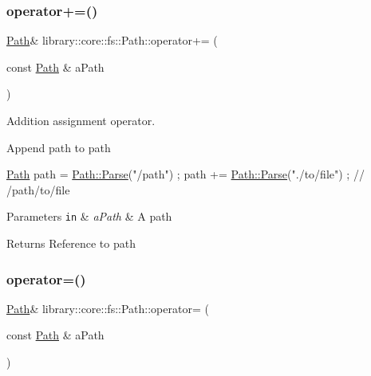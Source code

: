 \subsubsection{\texorpdfstring{operator+=()}{operator+=()}}
{\footnotesize\ttfamily \hyperlink{classlibrary_1_1core_1_1fs_1_1_path}{Path}\& library\+::core\+::fs\+::\+Path\+::operator+= (\begin{DoxyParamCaption}\item[{const \hyperlink{classlibrary_1_1core_1_1fs_1_1_path}{Path} \&}]{a\+Path }\end{DoxyParamCaption})}



Addition assignment operator. 

Append path to path


\begin{DoxyCode}
\hyperlink{classlibrary_1_1core_1_1fs_1_1_path_aaba9a8e0153813f08f78f1c3275734a4}{Path} path = \hyperlink{classlibrary_1_1core_1_1fs_1_1_path_aebf5bd3af83e0b7376616e146f3e55df}{Path::Parse}(\textcolor{stringliteral}{"/path"}) ;
path += \hyperlink{classlibrary_1_1core_1_1fs_1_1_path_aebf5bd3af83e0b7376616e146f3e55df}{Path::Parse}(\textcolor{stringliteral}{"./to/file"}) ; \textcolor{comment}{// /path/to/file}
\end{DoxyCode}



\begin{DoxyParams}[1]{Parameters}
\mbox{\tt in}  & {\em a\+Path} & A path \\
\hline
\end{DoxyParams}
\begin{DoxyReturn}{Returns}
Reference to path 
\end{DoxyReturn}
\mbox{\label{classlibrary_1_1core_1_1fs_1_1_path_a138827134fbe96f732c5708a6a331f89}} 
\subsubsection{\texorpdfstring{operator=()}{operator=()}}
{\footnotesize\ttfamily \hyperlink{classlibrary_1_1core_1_1fs_1_1_path}{Path}\& library\+::core\+::fs\+::\+Path\+::operator= (\begin{DoxyParamCaption}\item[{const \hyperlink{classlibrary_1_1core_1_1fs_1_1_path}{Path} \&}]{a\+Path }\end{DoxyParamCaption})}



